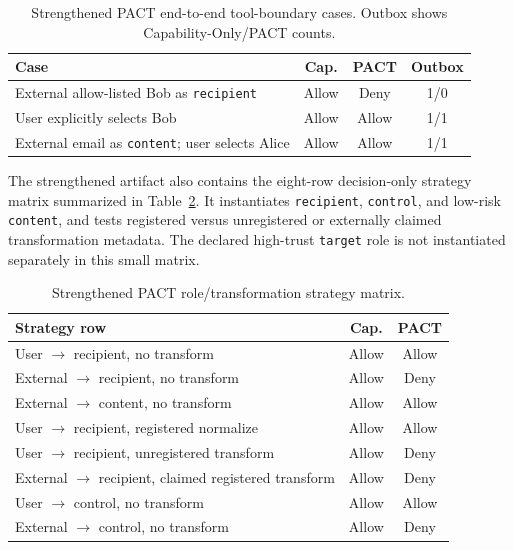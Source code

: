 \documentclass[journal]{IEEEtran}
\begin{document}
\begin{table}[t]
\centering
\scriptsize
\caption{Strengthened PACT end-to-end tool-boundary cases. Outbox shows Capability-Only/PACT counts.}
\label{tab:pact-e2e}
\begin{tabular}{p{}ccc}
\toprule
Case & Cap. & PACT & Outbox \\
\midrule
External allow-listed Bob as \texttt{recipient} & Allow & Deny & 1/0 \\
User explicitly selects Bob & Allow & Allow & 1/1 \\
External email as \texttt{content}; user selects Alice & Allow & Allow & 1/1 \\
\bottomrule
\end{tabular}
\end{table}

The strengthened artifact also contains the eight-row decision-only strategy
matrix summarized in Table~\ref{tab:pact-matrix}. It instantiates
\texttt{recipient}, \texttt{control}, and low-risk \texttt{content}, and tests
registered versus unregistered or externally claimed transformation metadata.
The declared high-trust \texttt{target} role is not instantiated separately in
this small matrix.

\begin{table}[t]
\centering
\scriptsize
\caption{Strengthened PACT role/transformation strategy matrix.}
\label{tab:pact-matrix}
\begin{tabular}{p{}cc}
\toprule
Strategy row & Cap. & PACT \\
\midrule
User $\rightarrow$ recipient, no transform & Allow & Allow \\
External $\rightarrow$ recipient, no transform & Allow & Deny \\
External $\rightarrow$ content, no transform & Allow & Allow \\
User $\rightarrow$ recipient, registered normalize & Allow & Allow \\
User $\rightarrow$ recipient, unregistered transform & Allow & Deny \\
External $\rightarrow$ recipient, claimed registered transform & Allow & Deny \\
User $\rightarrow$ control, no transform & Allow & Allow \\
External $\rightarrow$ control, no transform & Allow & Deny \\
\bottomrule
\end{tabular}
\end{table}
\end{document}
